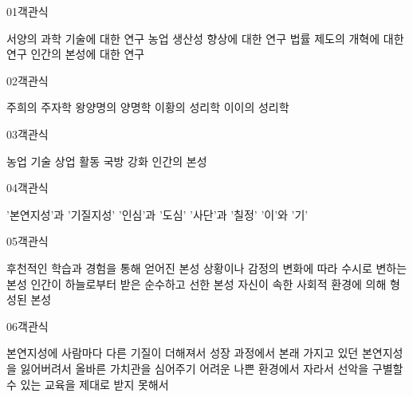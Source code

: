 \documentclass[fs9,seriesRus]{korfarm-base}
\begin{document}
\par\medskip
\kfBeginMC
\begin{kfQBlock}{01}{객관식}
\begin{kfChoices}
\kfChoice 서양의 과학 기술에 대한 연구
\kfChoice 농업 생산성 향상에 대한 연구
\kfChoice 법률 제도의 개혁에 대한 연구
\kfChoice 인간의 본성에 대한 연구
\end{kfChoices}
\end{kfQBlock}
\begin{kfQBlock}{02}{객관식}
\begin{kfChoices}
\kfChoice 주희의 주자학
\kfChoice 왕양명의 양명학
\kfChoice 이황의 성리학
\kfChoice 이이의 성리학
\end{kfChoices}
\end{kfQBlock}
\begin{kfQBlock}{03}{객관식}
\begin{kfChoices}
\kfChoice 농업 기술
\kfChoice 상업 활동
\kfChoice 국방 강화
\kfChoice 인간의 본성
\end{kfChoices}
\end{kfQBlock}
\begin{kfQBlock}{04}{객관식}
\begin{kfChoices}
\kfChoice '본연지성'과 '기질지성'
\kfChoice '인심'과 '도심'
\kfChoice '사단'과 '칠정'
\kfChoice '이'와 '기'
\end{kfChoices}
\end{kfQBlock}
\begin{kfQBlock}{05}{객관식}
\begin{kfChoices}
\kfChoice 후천적인 학습과 경험을 통해 얻어진 본성
\kfChoice 상황이나 감정의 변화에 따라 수시로 변하는 본성
\kfChoice 인간이 하늘로부터 받은 순수하고 선한 본성
\kfChoice 자신이 속한 사회적 환경에 의해 형성된 본성
\end{kfChoices}
\end{kfQBlock}
\begin{kfQBlock}{06}{객관식}
\begin{kfChoices}
\kfChoice 본연지성에 사람마다 다른 기질이 더해져서
\kfChoice 성장 과정에서 본래 가지고 있던 본연지성을 잃어버려서
\kfChoice 올바른 가치관을 심어주기 어려운 나쁜 환경에서 자라서
\kfChoice 선악을 구별할 수 있는 교육을 제대로 받지 못해서
\end{kfChoices}
\end{kfQBlock}
\end{document}
